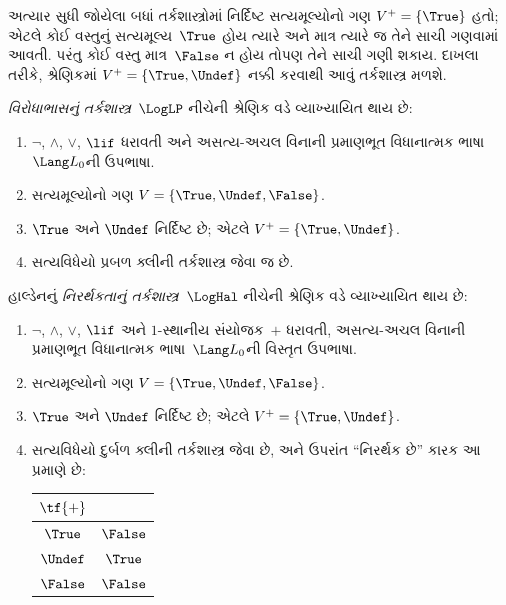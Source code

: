 \begingroup
\makeatletter{}\makeatother


\label{guunit:OLP-0397}


અત્યાર સુધી જોયેલા બધાં તર્કશાસ્ત્રોમાં નિર્દિષ્ટ સત્યમૂલ્યોનો ગણ
$V^+ = \{\True\}$ હતો; એટલે કોઈ વસ્તુનું સત્યમૂલ્ય~$\True$
હોય ત્યારે અને માત્ર ત્યારે જ તેને સાચી ગણવામાં આવતી. પરંતુ કોઈ વસ્તુ
માત્ર~$\False$ ન હોય તોપણ તેને સાચી ગણી શકાય. દાખલા તરીકે,
શ્રેણિકમાં $V^+ = \{\True, \Undef\}$ નક્કી કરવાથી આવું
તર્કશાસ્ત્ર મળશે.

\begin{defn}
\emph{વિરોધાભાસનું તર્કશાસ્ત્ર}~$\LogLP$ નીચેની શ્રેણિક વડે વ્યાખ્યાયિત થાય છે:
\begin{enumerate}
  \item $\lnot$, $\land$, $\lor$, $\lif$ ધરાવતી અને
  અસત્ય-અચલ વિનાની પ્રમાણભૂત વિધાનાત્મક ભાષા~$\Lang L_0$ની ઉપભાષા.
  \item સત્યમૂલ્યોનો ગણ $V = \{\True, \Undef, \False\}$.
  \item $\True$ અને $\Undef$ નિર્દિષ્ટ છે; એટલે $V^+ = \{\True, \Undef\}$.
  \item સત્યવિધેયો પ્રબળ ક્લીની તર્કશાસ્ત્ર જેવા જ છે.
\end{enumerate}
\end{defn}

\begin{defn}
હાલ્ડેનનું \emph{નિરર્થકતાનું તર્કશાસ્ત્ર}~$\LogHal$ નીચેની શ્રેણિક વડે
વ્યાખ્યાયિત થાય છે:
\begin{enumerate}
  \item $\lnot$, $\land$, $\lor$, $\lif$ અને $1$-સ્થાનીય
  સંયોજક~$+$ ધરાવતી, અસત્ય-અચલ વિનાની પ્રમાણભૂત
  વિધાનાત્મક ભાષા~$\Lang L_0$ની વિસ્તૃત ઉપભાષા.
  \item સત્યમૂલ્યોનો ગણ $V = \{\True, \Undef, \False\}$.
  \item $\True$ અને $\Undef$ નિર્દિષ્ટ છે; એટલે $V^+ = \{\True, \Undef\}$.
  \item સત્યવિધેયો દુર્બળ ક્લીની તર્કશાસ્ત્ર જેવા છે, અને ઉપરાંત
  ``નિરર્થક છે'' કારક આ પ્રમાણે છે:
  \begin{center}
    \begin{tabular}{c|c}
    $\tf{+}$ & \\
    \hline
    $\True$ & $\False$ \\
    $\Undef$ & $\True$ \\
    $\False$ & $\False$
    \end{tabular}
  \end{center}
\end{enumerate}
\end{defn}

